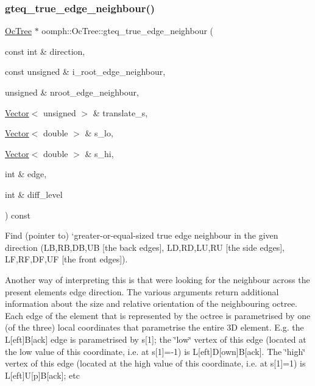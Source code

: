 \subsubsection{\texorpdfstring{gteq\+\_\+true\+\_\+edge\+\_\+neighbour()}{gteq\_true\_edge\_neighbour()}}
{\footnotesize\ttfamily \hyperlink{classoomph_1_1OcTree}{Oc\+Tree} $\ast$ oomph\+::\+Oc\+Tree\+::gteq\+\_\+true\+\_\+edge\+\_\+neighbour (\begin{DoxyParamCaption}\item[{const int \&}]{direction,  }\item[{const unsigned \&}]{i\+\_\+root\+\_\+edge\+\_\+neighbour,  }\item[{unsigned \&}]{nroot\+\_\+edge\+\_\+neighbour,  }\item[{\hyperlink{classoomph_1_1Vector}{Vector}$<$ unsigned $>$ \&}]{translate\+\_\+s,  }\item[{\hyperlink{classoomph_1_1Vector}{Vector}$<$ double $>$ \&}]{s\+\_\+lo,  }\item[{\hyperlink{classoomph_1_1Vector}{Vector}$<$ double $>$ \&}]{s\+\_\+hi,  }\item[{int \&}]{edge,  }\item[{int \&}]{diff\+\_\+level }\end{DoxyParamCaption}) const}



Find (pointer to) `greater-\/or-\/equal-\/sized true edge neighbour\textquotesingle{} in the given direction (LB,RB,DB,UB \mbox{[}the back edges\mbox{]}, LD,RD,LU,RU \mbox{[}the side edges\mbox{]}, LF,RF,DF,UF \mbox{[}the front edges\mbox{]}). 

Another way of interpreting this is that we\textquotesingle{}re looking for the neighbour across the present element\textquotesingle{}s edge \textquotesingle{}direction\textquotesingle{}. The various arguments return additional information about the size and relative orientation of the neighbouring octree. Each edge of the element that is represented by the octree is parametrised by one (of the three) local coordinates that parametrise the entire 3D element. E.\+g. the L\mbox{[}eft\mbox{]}B\mbox{[}ack\mbox{]} edge is parametrised by s\mbox{[}1\mbox{]}; the \char`\"{}low\char`\"{} vertex of this edge (located at the low value of this coordinate, i.\+e. at s\mbox{[}1\mbox{]}=-\/1) is L\mbox{[}eft\mbox{]}D\mbox{[}own\mbox{]}B\mbox{[}ack\mbox{]}. The \char`\"{}high\char`\"{} vertex of this edge (located at the high value of this coordinate, i.\+e. at s\mbox{[}1\mbox{]}=1) is L\mbox{[}eft\mbox{]}U\mbox{[}p\mbox{]}B\mbox{[}ack\mbox{]}; etc

